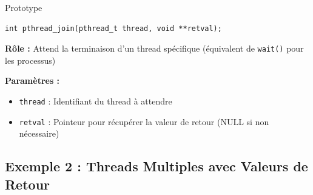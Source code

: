 \documentclass[11pt,a4paper]{article}
\begin{document}
\begin{definitionbox}{Prototype}
\begin{verbatim}
int pthread_join(pthread_t thread, void **retval);
\end{verbatim}
\end{definitionbox}

\textbf{Rôle :} Attend la terminaison d'un thread spécifique (équivalent de \texttt{wait()} pour les processus)

\textbf{Paramètres :}
\begin{itemize}
    \item \texttt{thread} : Identifiant du thread à attendre
    \item \texttt{retval} : Pointeur pour récupérer la valeur de retour (NULL si non nécessaire)
\end{itemize}

\subsection{Exemple 2 : Threads Multiples avec Valeurs de Retour}
\end{document}
